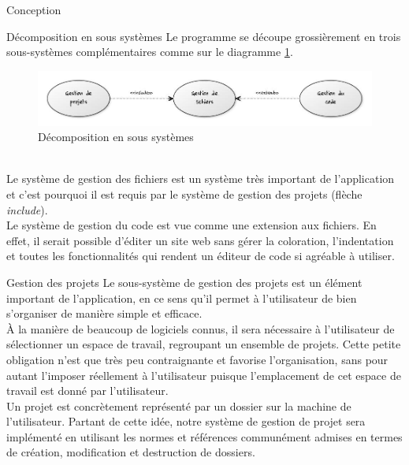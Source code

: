 \documentclass[a4paper, 12pt]{report}
\begin{document}
	\begin{part}{Conception}
		\begin{chapter}{Décomposition en sous systèmes}
			Le programme se découpe grossièrement en trois sous-systèmes complémentaires comme sur le diagramme \ref{poulpe}.
			\begin{figure}[h]
				\begin{center}
					\includegraphics[width=17cm]{images/decompositionSousSystemes.jpg}
					\caption{Décomposition en sous systèmes}
					\label{poulpe}
				\end{center}
			\end{figure}~\\
			Le système de gestion des fichiers est un système très important de l'application et c'est pourquoi il est requis
			par le système de gestion des projets (flèche \emph{include}).\\
			Le système de gestion du code est vue comme une extension aux fichiers. En effet, il serait possible d'éditer un
			site web sans gérer la coloration, l'indentation et toutes les fonctionnalités qui rendent un éditeur de code si agréable à utiliser.
			
			\begin{section}{Gestion des projets}
				Le sous-système de gestion des projets est un élément important de l'application, en ce sens qu'il permet à l'utilisateur
				de bien s'organiser de manière simple et efficace.\\


				À la manière de beaucoup de logiciels connus, il sera nécessaire à l'utilisateur de sélectionner un espace de travail,
				regroupant un ensemble de projets. Cette petite obligation n'est que très peu contraignante et favorise l'organisation, 
				sans pour autant l'imposer réellement à l'utilisateur puisque l'emplacement de cet espace de travail est donné par l'utilisateur.\\


				Un projet est concrètement représenté par un dossier sur la machine de l'utilisateur. Partant de cette idée, notre système
				de gestion de projet sera implémenté en utilisant les normes et références communément admises en termes de création,
				modification et destruction de dossiers.\\



\end{section}
\end{chapter}
\end{part}
\end{document}
